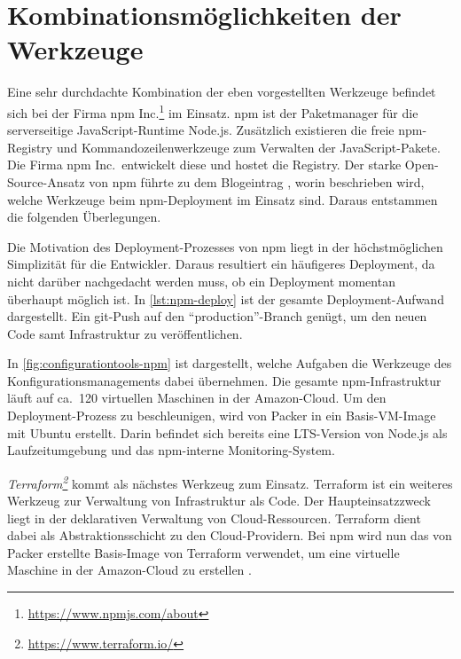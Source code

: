 \section{Kombinationsmöglichkeiten der Werkzeuge}
\label{sec:werkzeugkombinationsmoeglichkeiten}
Eine sehr durchdachte Kombination der eben vorgestellten Werkzeuge befindet sich bei der Firma npm Inc.\footnote{\url{https://www.npmjs.com/about}} im Einsatz.
npm ist der Paketmanager für die serverseitige JavaScript-Runtime Node.js.
Zusätzlich existieren die freie npm-Registry und Kommandozeilenwerkzeuge zum Verwalten der JavaScript-Pakete.
Die Firma npm Inc.\ entwickelt diese und hostet die Registry.
Der starke Open-Source-Ansatz von npm führte zu dem Blogeintrag \autocite{npm-deployment:online}, worin beschrieben wird, welche Werkzeuge beim npm-Deployment im Einsatz sind. Daraus entstammen die folgenden Überlegungen.


Die Motivation des Deployment-Prozesses von npm liegt in der höchstmöglichen Simplizität für die Entwickler.
Daraus resultiert ein häufigeres Deployment, da nicht darüber nachgedacht werden muss, ob ein Deployment momentan überhaupt möglich ist.
In \cref{lst:npm-deploy} ist der gesamte Deployment-Aufwand dargestellt.
Ein git-Push auf den "`production"'-Branch genügt, um den neuen Code samt Infrastruktur zu veröffentlichen.

In \cref{fig:configurationtools-npm} ist dargestellt, welche Aufgaben die Werkzeuge des Konfigurationsmanagements dabei übernehmen.
Die gesamte npm-Infrastruktur läuft auf ca.\ 120 virtuellen Maschinen in der Amazon-Cloud.
Um den Deployment-Prozess zu beschleunigen, wird von Packer in  ein Basis-VM-Image mit Ubuntu erstellt.
Darin befindet sich bereits eine LTS-Version von Node.js als Laufzeitumgebung und das npm-interne Monitoring-System.

\emph{Terraform\footnote{\url{https://www.terraform.io/}}} kommt als nächstes Werkzeug zum Einsatz.
Terraform ist ein weiteres Werkzeug zur Verwaltung von Infrastruktur als Code.
Der Haupteinsatzzweck liegt in der deklarativen Verwaltung von Cloud-Ressourcen.
Terraform dient dabei als Abstraktionsschicht zu den Cloud-Providern.
Bei npm wird nun das von Packer erstellte Basis-Image von Terraform verwendet, um eine virtuelle Maschine in der Amazon-Cloud zu erstellen .

